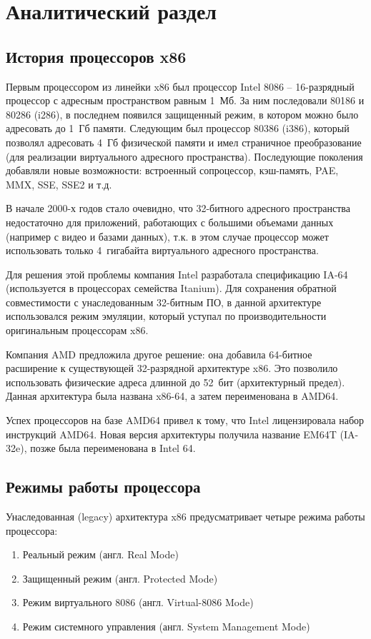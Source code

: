 \chapter{Аналитический раздел}
\label{cha:analysis}

\section{История процессоров x86}
Первым процессором из линейки x86 был процессор Intel 8086 -- 16-разрядный процессор с адресным пространством
равным 1~Мб. За ним последовали 80186 и 80286 (i286), в последнем появился защищенный режим, в котором можно
было адресовать до 1~Гб памяти. Следующим был процессор 80386 (i386), который позволял адресовать 4~Гб физической
памяти и имел страничное преобразование (для реализации виртуального адресного пространства). Последующие
поколения добавляли новые возможности: встроенный сопроцессор, кэш-память, PAE, MMX, SSE, SSE2 и т.д.

В начале 2000-х годов стало очевидно, что 32-битного адресного пространства недостаточно для приложений,
работающих с большими объемами данных (например с видео и базами данных), т.к. в этом случае процессор
может использовать только 4~гигабайта виртуального адресного пространства.

Для решения этой проблемы компания Intel разработала спецификацию IA-64 (используется в процессорах семейства
Itanium). Для сохранения обратной совместимости с унаследованным 32-битным ПО, в данной архитектуре использовался
режим эмуляции, который уступал по производительности оригинальным процессорам x86.

Компания AMD предложила другое решение: она добавила 64-битное расширение к существующей 32-разрядной архитектуре x86.
Это позволило использовать физические адреса длинной до 52~бит (архитектурный предел). Данная архитектура была
названа x86-64, а затем переименована в AMD64.

Успех процессоров на базе AMD64 привел к тому, что Intel лицензировала набор инструкций AMD64. Новая версия архитектуры
получила название EM64T (IA-32e), позже была переименована в Intel 64.


\section{Режимы работы процессора}
Унаследованная (legacy) архитектура x86 предусматривает четыре режима работы процессора:
\begin{enumerate}[1.]
	\item Реальный режим (англ. Real Mode)
	\item Защищенный режим (англ. Protected Mode)
	\item Режим виртуального 8086 (англ. Virtual-8086 Mode)
	\item Режим системного управления (англ. System Management Mode)
\end{enumerate}

